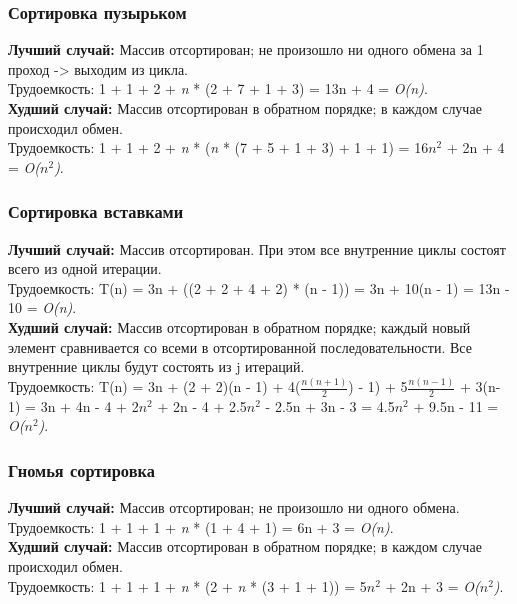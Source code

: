 \documentclass[a4paper, 12pt]{article}
\begin{document}
\begin{flushleft}
	\subsubsection{Сортировка пузырьком}
	\hspace*{5mm} {\bf Лучший случай: } Массив отсортирован; не произошло ни одного обмена за 1 проход -> выходим из цикла.
	\\ Трудоемкость: 1 + 1 + 2 + {\it n} * (2 + 7 + 1 + 3) = 13n + 4 = {\it O(n)}.
	\\ \hspace*{5mm} {\bf Худший случай: } Массив отсортирован в обратном порядке; в каждом случае происходил обмен.
	\\ Трудоемкость: 1 + 1 + 2 + {\it n} * ({\it n} * (7 + 5 + 1 + 3) + 1 + 1) = 16$n^2$ + 2n + 4 = {\it O($n^2$)}.
	
	\subsubsection{Сортировка вставками}
	\hspace*{5mm} {\bf Лучший случай: } Массив отсортирован. При этом все внутренние циклы состоят всего из одной итерации.
	\\ Трудоемкость: T(n) = 3n + ((2 + 2 + 4 + 2) * (n - 1)) = 3n + 10(n - 1) = 13n - 10 = {\it O(n)}.
	\\ \hspace*{5mm} {\bf Худший случай: } Массив отсортирован в обратном порядке; каждый новый элемент сравнивается со всеми в отсортированной последовательности. Все внутренние циклы будут состоять из j итераций.
	\\ Трудоемкость:  T(n) = 3n + (2 + 2)(n - 1) + 4($\frac{n(n+1)}{2}$) - 1) + 5$\frac{n(n-1)}{2}$ + 3(n-1) = 3n + 4n - 4 + 2$n^2$ + 2n - 4 + 2.5$n^2$ - 2.5n + 3n - 3 = 4.5$n^2$ + 9.5n - 11 = {\it O($n^2$)}.

	\clearpage
	\newpage
	\subsubsection{Гномья сортировка}
	\hspace*{5mm} {\bf Лучший случай: } Массив отсортирован; не произошло ни одного обмена.
	\\ Трудоемкость: 1 + 1 + 1 + {\it n} * (1 + 4 + 1) = 6n + 3 = {\it O(n)}.
	\\ \hspace*{5mm} {\bf Худший случай: } Массив отсортирован в обратном порядке; в каждом случае происходил обмен.
	\\ Трудоемкость: 1 + 1 + 1 + {\it n} * (2 + {\it n} * (3 + 1 + 1)) = 5$n^2$ + 2n + 3 = {\it O($n^2$)}.
	

\end{flushleft}
\end{document}
